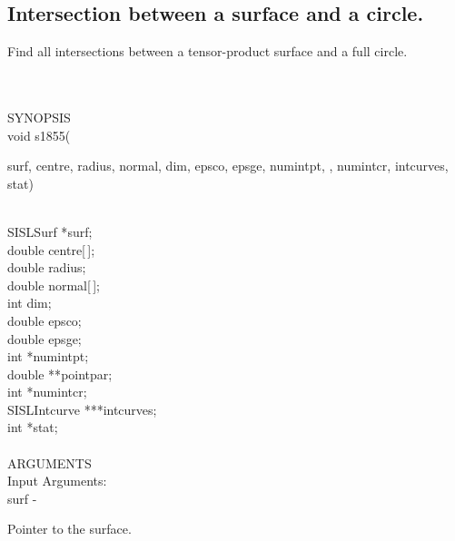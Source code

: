 \subsection{Intersection between a surface and a circle.}
\begin{minipg1}
  Find all intersections between a tensor-product surface and a full circle.
\end{minipg1} \\ \\
SYNOPSIS\\
        \>void s1855(\begin{minipg3}
                {\fov surf}, {\fov centre}, {\fov radius}, {\fov normal}, {\fov dim}, {\fov epsco}, {\fov epsge},
                {\fov numintpt}, , {\fov numintcr}, {\fov intcurves}, {\fov stat})
                \end{minipg3}\\[0.3ex]
                \>\>    SISLSurf        \>      *{\fov surf};\\
                \>\>    double  \>      {\fov centre}[\,];\\
                \>\>    double  \>      {\fov radius};\\
                \>\>    double  \>      {\fov normal}[\,];\\
                \>\>    int     \>      {\fov dim};\\
                \>\>    double  \>      {\fov epsco};\\
                \>\>    double  \>      {\fov epsge};\\
                \>\>    int     \>      *{\fov numintpt};\\
                \>\>    double  \>      **{\fov pointpar};\\
                \>\>    int     \>      *{\fov numintcr};\\
                \>\>    SISLIntcurve\>  ***{\fov intcurves};\\
                \>\>    int     \>      *{\fov stat};\\
\\
ARGUMENTS\\
        \>Input Arguments:\\
        \>\>    {\fov surf}\> - \>      \begin{minipg2}
                                Pointer to the surface.
                                \end{minipg2}\\
